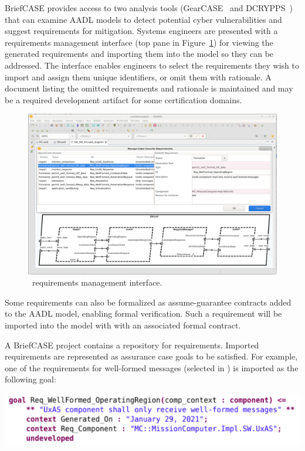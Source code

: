 BriefCASE provides access to two analysis tools (GearCASE~\cite{gearcase2020} and
DCRYPPS~\cite{dcrypps2019}) that can examine AADL models to detect potential cyber vulnerabilities
and suggest requirements for mitigation.
%
Systems engineers are %
presented with a requirements management interface
(top pane in Figure~\ref{fig:req-mgmt}) for viewing the generated requirements and importing them into the model
so they can be addressed. The interface enables engineers to select the requirements they wish to
import and assign them unique identifiers, or omit them with rationale. A document listing the omitted
requirements and rationale is maintained and may be a required development artifact for some
certification domains. 

\begin{figure}[h]
	\centering
	\includegraphics[width=\textwidth]{figs/req-mgmt.png}
	\caption{\briefcase \ requirements management interface.} 
	\label{fig:req-mgmt} 
\end{figure}

Some requirements can also be formalized as assume-guarantee contracts
added to the AADL model, enabling formal verification. 
Such a requirement will be imported into the model with with an associated formal
contract.

A BriefCASE project contains a repository for requirements. Imported requirements are represented 
as assurance case goals to be satisfied. For example, one of the requirements for well-formed 
messages (selected in ) is imported as the following goal:

\noindent
\includegraphics[width=1\columnwidth]{figs/req-wellformed-or.png}

